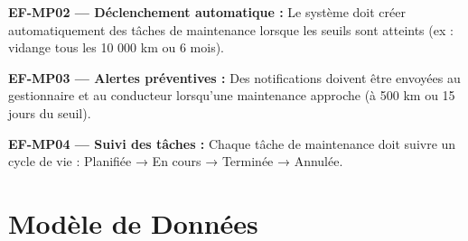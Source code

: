 \documentclass[12pt,a4paper]{report}
\begin{document}
\begin{reqbox}
\textbf{EF-MP02 — Déclenchement automatique :} Le système doit créer automatiquement des tâches de maintenance lorsque les seuils sont atteints (ex : vidange tous les 10 000 km ou 6 mois).
\end{reqbox}

\begin{reqbox}
\textbf{EF-MP03 — Alertes préventives :} Des notifications doivent être envoyées au gestionnaire et au conducteur lorsqu'une maintenance approche (à 500 km ou 15 jours du seuil).
\end{reqbox}

\begin{reqbox}
\textbf{EF-MP04 — Suivi des tâches :} Chaque tâche de maintenance doit suivre un cycle de vie : Planifiée → En cours → Terminée → Annulée.
\end{reqbox}

\section{Modèle de Données}
\end{document}
